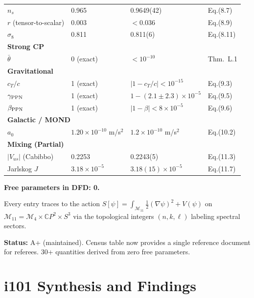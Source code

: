 \documentclass[11pt,a4paper]{article}
\theoremstyle{remark}
\newcommand{\CP}{\mathbb{C}P}
\begin{document}
\begin{longtable}{p{4.5cm}p{4cm}p{2.5cm}p{2.5cm}}
$n_s$ & 0.965 & 0.9649(42) & Eq.(8.7) \\
$r$ (tensor-to-scalar) & 0.003 & $< 0.036$ & Eq.(8.9) \\
$\sigma_8$ & 0.811 & 0.811(6) & Eq.(8.11) \\
\midrule
\multicolumn{4}{l}{\textbf{Strong CP}} \\
\midrule
$\bar\theta$ & 0 (exact) & $< 10^{-10}$ & Thm.~L.1 \\
\midrule
\multicolumn{4}{l}{\textbf{Gravitational}} \\
\midrule
$c_T/c$ & 1 (exact) & $|1 - c_T/c| < 10^{-15}$ & Eq.(9.3) \\
$\gamma_{\rm PPN}$ & 1 (exact) & $1 - (2.1 \pm 2.3)\times 10^{-5}$ & Eq.(9.5) \\
$\beta_{\rm PPN}$ & 1 (exact) & $|1-\beta| < 8\times10^{-5}$ & Eq.(9.6) \\
\midrule
\multicolumn{4}{l}{\textbf{Galactic / MOND}} \\
\midrule
$a_0$ & $1.20 \times 10^{-10}$ m/s$^2$ & $1.2 \times 10^{-10}$ m/s$^2$ & Eq.(10.2) \\
\midrule
\multicolumn{4}{l}{\textbf{Mixing (Partial)}} \\
\midrule
$|V_{us}|$ (Cabibbo) & 0.2253 & 0.2243(5) & Eq.(11.3) \\
Jarlskog $J$ & $3.18 \times 10^{-5}$ & $3.18(15) \times 10^{-5}$ & Eq.(11.7) \\
\bottomrule
\end{longtable}

\textbf{Free parameters in DFD: 0.}

Every entry traces to the action $S[\psi] = \int_{\mathcal{M}_{11}} \frac{1}{2}(\nabla\psi)^2 + V(\psi)$
on $\mathcal{M}_{11} = \mathcal{M}_4 \times \CP^2 \times S^3$ via the
topological integers $(n, k, \ell)$ labeling spectral sectors.

\begin{tcolorbox}[colback=green!5!white, colframe=dfdgreen,
  title=Parameter Economy: Grade Assessment]
\textbf{Status:} A+ (maintained). Census table now provides a single
reference document for referees. 30+ quantities derived from zero
free parameters.
\end{tcolorbox}


\newpage
\part{i101 Synthesis and Findings}
\label{part:synthesis}
\end{document}
